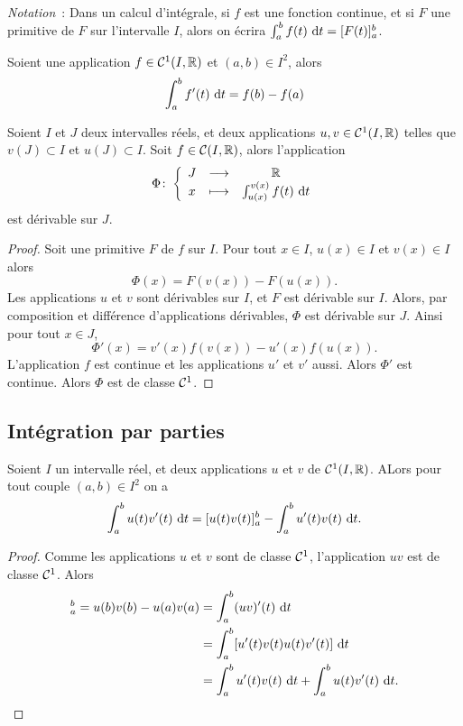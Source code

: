 \emph{Notation}~: Dans un calcul d'intégrale, si \(f\) est une fonction continue,  et si \(F\) une primitive de \(F\) sur l'intervalle \(I\), alors on écrira \(\int_a^b f(t)\,\mathop{}\mathopen{}\mathrm{d} t=[F(t)]_a^b\).

\begin{corth}
  Soient une application \(f \in \mathcal{C}^{1}(I,\mathbb{R})\) et \((a,b) \in I^2\), alors
  \begin{equation}
    \int_a^b f'(t)\,\mathop{}\mathopen{}\mathrm{d} t=f(b)-f(a)
  \end{equation}
\end{corth}

\begin{prop}
  Soient \(I\) et \(J\) deux intervalles réels, et deux applications \(u,v \in \mathcal{C}^{1}(I,\mathbb{R})\) telles que \(v(J) \subset I\) et \(u(J) \subset I\). Soit \(f \in \mathcal{C}(I,\mathbb{R})\), alors l'application
  \begin{equation}
    \Phi\colon \left\{\begin{array}{ccc} J & \longrightarrow &\mathbb{R}\\ x & \longmapsto & \int_{u(x)}^{v(x)}f(t)\,\mathop{}\mathopen{}\mathrm{d} t \end{array} \right.
  \end{equation}
  est dérivable sur \(J\).
\end{prop}
\begin{proof}
  Soit une primitive \(F\) de \(f\) sur \(I\). Pour tout \(x \in I\), \(u(x) \in I\) et \(v(x) \in I\) alors
  \begin{equation}
    \Phi(x) = F(v(x))-F(u(x)).
  \end{equation}
  Les applications \(u\) et \(v\) sont dérivables sur \(I\), et \(F\) est dérivable sur \(I\). Alors, par composition et différence d'applications dérivables, \(\Phi\) est dérivable sur \(J\). Ainsi pour tout \(x \in J\),
  \begin{equation}
    \Phi'(x) = v'(x)f(v(x)) -u'(x)f(u(x)).
  \end{equation}
  L'application \(f\) est continue et les applications \(u'\) et \(v'\) aussi. Alors \(\Phi'\) est continue. Alors \(\Phi\) est de classe \(\mathcal{C}^{1}\).
\end{proof}

\subsection{Intégration par parties}

\begin{theo}
  Soient \(I\) un intervalle réel, et deux applications \(u\) et \(v\) de \(\mathcal{C}^{1}(I,\mathbb{R})\). ALors pour tout couple \((a,b) \in I^2\) on a
  \begin{equation}
    \int_a^b u(t)v'(t)\,\mathop{}\mathopen{}\mathrm{d} t = [u(t)v(t)]_a^b - \int_a^b u'(t)v(t)\,\mathop{}\mathopen{}\mathrm{d} t.
  \end{equation}
\end{theo}
\begin{proof}
  Comme les applications \(u\) et \(v\) sont de classe \(\mathcal{C}^{1}\), l'application \(uv\) est de classe \(\mathcal{C}^{1}\). Alors
  \begin{align}
    [u(t)v(t)]_a^b = u(b)v(b)-u(a)v(a) &=\int_a^b (uv)'(t)\,\diff t \\
    &=\int_a^b[u'(t)v(t)u(t)v'(t)]\,\diff t \\
    &=\int_a^b u'(t)v(t)\,\diff t + \int_a^b u(t)v'(t)\,\diff t.
  \end{align}
\end{proof}

